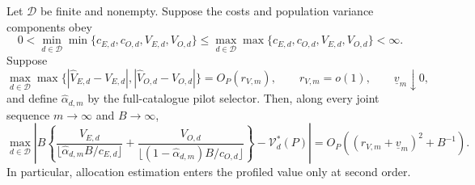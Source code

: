 Let \(\mathcal D\) be finite and nonempty.  Suppose the costs and population variance components obey
\[
 0<\min_{d\in\mathcal D}\min\{c_{E,d},c_{O,d},V_{E,d},V_{O,d}\}
 \le
 \max_{d\in\mathcal D}\max\{c_{E,d},c_{O,d},V_{E,d},V_{O,d}\}<\infty.
\]
Suppose
\[
 \max_{d\in\mathcal D}\max\bigl\{
 |\widehat V_{E,d}-V_{E,d}|,
 |\widehat V_{O,d}-V_{O,d}|\bigr\}=O_P(r_{V,m}),
 \qquad r_{V,m}=o(1),
 \qquad \underline v_m\downarrow0,
\]
and define \(\widehat\alpha_{d,m}\) by the full-catalogue pilot selector.  Then, along every joint sequence \(m\to\infty\) and \(B\to\infty\),
\[
 \max_{d\in\mathcal D}\left|B\left\{
 \frac{V_{E,d}}{\lfloor\widehat\alpha_{d,m}B/c_{E,d}\rfloor}
 +\frac{V_{O,d}}{\lfloor(1-\widehat\alpha_{d,m})B/c_{O,d}\rfloor}
 \right\}-\mathcal V_d^*(P)\right|
 =O_P\!\left((r_{V,m}+\underline v_m)^2+B^{-1}\right).
\]
In particular, allocation estimation enters the profiled value only at second order.